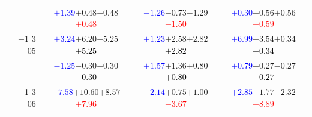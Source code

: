 \documentclass[compress]{beamer}
\begin{document}
\begin{frame}
\begin{tabular}{r | c | c | c}
          & \textcolor{blue}{$+1.39$}\hspace{0.1 cm}$+0.48$\hspace{0.1 cm}$+0.48$\hspace{0.1 cm}\textcolor{red}{$+0.48$} & \textcolor{blue}{$-1.26$}\hspace{0.1 cm}$-0.73$\hspace{0.1 cm}$-1.29$\hspace{0.1 cm}\textcolor{red}{$-1.50$} & \textcolor{blue}{$+0.30$}\hspace{0.1 cm}$+0.56$\hspace{0.1 cm}$+0.56$\hspace{0.1 cm}\textcolor{red}{$+0.59$} \\
$-$1 3 05 & \textcolor{blue}{$+3.24$}\hspace{0.1 cm}$+6.20$\hspace{0.1 cm}$+5.25$\hspace{0.1 cm}\textcolor{black}{$+5.25$} & \textcolor{blue}{$+1.23$}\hspace{0.1 cm}$+2.58$\hspace{0.1 cm}$+2.82$\hspace{0.1 cm}\textcolor{black}{$+2.82$} & \textcolor{blue}{$+6.99$}\hspace{0.1 cm}$+3.54$\hspace{0.1 cm}$+0.34$\hspace{0.1 cm}\textcolor{black}{$+0.34$} \\
          & \textcolor{blue}{$-1.25$}\hspace{0.1 cm}$-0.30$\hspace{0.1 cm}$-0.30$\hspace{0.1 cm}\textcolor{black}{$-0.30$} & \textcolor{blue}{$+1.57$}\hspace{0.1 cm}$+1.36$\hspace{0.1 cm}$+0.80$\hspace{0.1 cm}\textcolor{black}{$+0.80$} & \textcolor{blue}{$+0.79$}\hspace{0.1 cm}$-0.27$\hspace{0.1 cm}$-0.27$\hspace{0.1 cm}\textcolor{black}{$-0.27$} \\
$-$1 3 06 & \textcolor{blue}{$+7.58$}\hspace{0.1 cm}$+10.60$\hspace{0.1 cm}$+8.57$\hspace{0.1 cm}\textcolor{red}{$+7.96$} & \textcolor{blue}{$-2.14$}\hspace{0.1 cm}$+0.75$\hspace{0.1 cm}$+1.00$\hspace{0.1 cm}\textcolor{red}{$-3.67$} & \textcolor{blue}{$+2.85$}\hspace{0.1 cm}$-1.77$\hspace{0.1 cm}$-2.32$\hspace{0.1 cm}\textcolor{red}{$+8.89$} \\

\end{tabular}
\end{frame}
\end{document}
